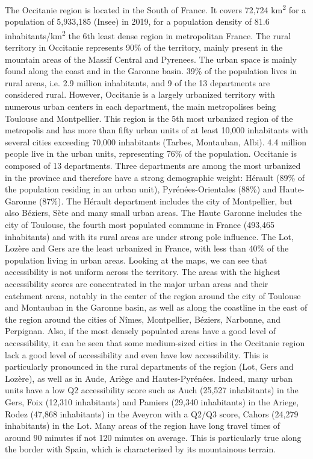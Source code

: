 The Occitanie region is located in the South of France. It covers 72,724
km\textsuperscript{2} for a population of 5,933,185 (Insee) in 2019, for a
population density of 81.6 inhabitants/km\textsuperscript{2} the 6th least dense
region in metropolitan France. The rural territory in Occitanie represents 90\%
of the territory, mainly present in the mountain areas of the Massif Central and
Pyrenees. The urban space is mainly found along the coast and in the Garonne
basin. 39\% of the population lives in rural areas, i.e. 2.9 million
inhabitants, and 9 of the 13 departments are considered rural. However,
Occitanie is a largely urbanized territory with numerous urban centers in each
department, the main metropolises being Toulouse and Montpellier. This region is
the 5th most urbanized region of the metropolis and has more than fifty urban
units of at least 10,000 inhabitants with several cities exceeding 70,000
inhabitants (Tarbes, Montauban, Albi). 4.4 million people live in the urban
units, representing 76\% of the population. Occitanie is composed of 13
departments. Three departments are among the most urbanized in the province and
therefore have a strong demographic weight: Hérault (89\% of the population
residing in an urban unit), Pyrénées-Orientales (88\%) and Haute-Garonne (87\%).
The Hérault department includes the city of Montpellier, but also Béziers, Sète
and many small urban areas. The Haute Garonne includes the city of Toulouse, the
fourth most populated commune in France (493,465 inhabitants) and with its rural
areas are under strong pole influence.  The Lot, Lozère and Gers are the least
urbanized in France, with less than 40\% of the population living in urban
areas. Looking at the maps, we can see that accessibility is not uniform across
the territory. The areas with the highest accessibility scores are concentrated
in the major urban areas and their catchment areas, notably in the center of the
region around the city of Toulouse and Montauban in the Garonne basin, as well
as along the coastline in the east of the region around the cities of Nîmes,
Montpellier, Béziers, Narbonne, and Perpignan. Also, if the most densely
populated areas have a good level of accessibility, it can be seen that some
medium-sized cities in the Occitanie region lack a good level of accessibility
and even have low accessibility. This is particularly pronounced in the rural
departments of the region (Lot, Gers and Lozère), as well as in Aude, Ariège and
Hautes-Pyrénées. Indeed, many urban units have a low Q2 accessibility score such
as Auch (25,527 inhabitants) in the Gers, Foix (12,310 inhabitants) and Pamiers
(29,340 inhabitants) in the Ariege, Rodez (47,868 inhabitants) in the Aveyron
with a Q2/Q3 score, Cahors (24,279 inhabitants) in the Lot. Many areas of the
region have long travel times of around 90 minutes if not 120 minutes on
average. This is particularly true along the border with Spain, which is
characterized by its mountainous terrain.

